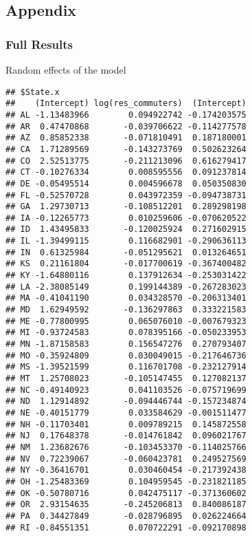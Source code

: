 \documentclass[
]{article}
\begin{document}
\hypertarget{appendix}{%
\subsection{Appendix}\label{appendix}}

\newpage

\hypertarget{full-results}{%
\subsubsection{Full Results}\label{full-results}}

Random effects of the model

\begin{verbatim}
## $State.x
##    (Intercept) log(res_commuters)  (Intercept)
## AL -1.13483966        0.094922742 -0.174203575
## AR  0.47470868       -0.039706622 -0.114277578
## AZ  0.85852338       -0.071810491  0.187180001
## CA  1.71289569       -0.143273769  0.502623264
## CO  2.52513775       -0.211213096  0.616279417
## CT -0.10276334        0.008595556  0.091237814
## DE -0.05495514        0.004596678  0.050350830
## FL -0.52570728        0.043972359 -0.094738731
## GA  1.29730713       -0.108512201  0.289298198
## IA -0.12265773        0.010259606 -0.070620522
## ID  1.43495833       -0.120025924  0.271602915
## IL -1.39499115        0.116682901 -0.290636113
## IN  0.61325984       -0.051295621  0.013264651
## KS  0.21161804       -0.017700619 -0.367400482
## KY -1.64880116        0.137912634 -0.253031422
## LA -2.38085149        0.199144389 -0.267283023
## MA -0.41041190        0.034328570 -0.206313401
## MD  1.62949592       -0.136297863  0.333221583
## ME -0.77800995        0.065076010 -0.007679323
## MI -0.93724583        0.078395166 -0.050233953
## MN -1.87158583        0.156547276  0.270793407
## MO -0.35924809        0.030049015 -0.217646736
## MS -1.39521599        0.116701708 -0.232127914
## MT  1.25708023       -0.105147455  0.127082137
## NC -0.49140923        0.041103526 -0.075719699
## ND  1.12914892       -0.094446744 -0.157234874
## NE -0.40151779        0.033584629 -0.001511477
## NH -0.11703401        0.009789215  0.145872558
## NJ  0.17648378       -0.014761842  0.096021767
## NM  1.23682676       -0.103453370 -0.114025766
## NV  0.72239067       -0.060423781  0.249527569
## NY -0.36416701        0.030460454 -0.217392438
## OH -1.25483369        0.104959545 -0.231821185
## OK -0.50780716        0.042475117 -0.371360602
## OR  2.93154635       -0.245206813  0.840086187
## PA  0.34427849       -0.028796895  0.026224664
## RI -0.84551351        0.070722291 -0.092170898

\end{verbatim}
\end{document}
